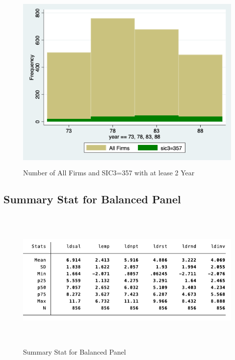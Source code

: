 \begin{figure}[h]
    \centering
    \includegraphics[height=9cm]{HW1/LATEX/Attachments/q1_2.png}
    \caption{Number of All Firms and SIC3=357 with at lease 2 Year}
    \label{fig:my_label}
\end{figure}

\newpage
\subsection{Summary Stat for Balanced Panel}
\begin{figure}[h]
    \centering
    \includegraphics[height=7cm]{HW1/LATEX/Attachments/q1_stat_balanced.png}
    \caption{Summary Stat for Balanced Panel}
    \label{fig:my_label}
\end{figure}

